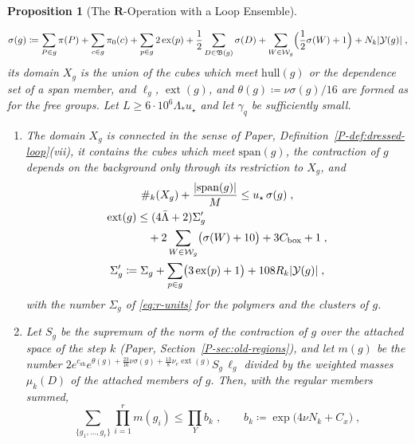 \documentclass[11pt]{preprint}
\DeclarePairedDelimiter{\abs}{\lvert}{\rvert}
\numberwithin{equation}{section}
\newtheorem{proposition}{Proposition}
\theoremstyle{definition}
\theoremstyle{remark}
\theoremstyle{plain}
\begin{document}
\begin{proposition}[The $\mathbf R$-Operation with a Loop Ensemble]
\begin{enumerate}[label=(\roman*)]
\begin{equation}\label{eq:r-bound-size}
    \sigma(g) \coloneqq \sum_{P \in g}\pi(P) + \sum_{c \in g}\pi_0(c) + \sum_{p \in g}2\operatorname{ex}(p) + \frac12\sum_{D \in \mathfrak B(g)}\sigma(D) + \sum_{W \in \mathcal W_g}\Bigl(\frac12\sigma(W) + 1\Bigr) + N_k\abs{\mathcal Y(g)}\;,
\end{equation}
its domain $X_g$ is the union of the cubes which meet $\mathrm{hull}(g)$ or the dependence set of a span member, and $\ell_g$, $\operatorname{ext}(g)$, and $\theta(g) \coloneqq \nu\sigma(g)/16$ are formed as for the free groups. Let $L \geq 6 \cdot 10^6\Lambda_*u_\star$ and let $\gamma_q$ be sufficiently small.
\begin{enumerate}[label=(\alph*)]
\item The domain $X_g$ is connected in the sense of Paper, Definition~\ref{P-def:dressed-loop}(vii), it contains the cubes which meet $\mathrm{span}(g)$, the contraction of $g$ depends on the background only through its restriction to $X_g$, and
\begin{equation}\label{eq:r-bound-units}
\begin{gathered}
    \#_k(X_g) + \frac{\abs{\mathrm{span}(g)}}{M} \leq u_\star\,\sigma(g)\;,\\
    \begin{aligned}
    \operatorname{ext}(g) &\leq (4\bar\Lambda + 2)\Sigma'_g\\
        &\quad + 2\sum_{W \in \mathcal W_g}\bigl(\sigma(W) + 10\bigr) + 3C_{\mathrm{box}} + 1\;,
    \end{aligned}\\
    \Sigma'_g \coloneqq \Sigma_g + \sum_{p \in g}\bigl(3\operatorname{ex}(p) + 1\bigr) + 108R_k\abs{\mathcal Y(g)}\;,
\end{gathered}
\end{equation}
with the number $\Sigma_g$ of \eqref{eq:r-units} for the polymers and the clusters of $g$.
\item Let $S_g$ be the supremum of the norm of the contraction of $g$ over the attached space of the step $k$ (Paper, Section~\ref{P-sec:old-regions}), and let $m(g)$ be the number $2e^{c_{\mathrm{sh}}}e^{\theta(g) + \frac{23}{16}\nu\sigma(g) + \frac{13}{8}\nu_e\operatorname{ext}(g)}S_g\,\ell_g$ divided by the weighted masses $\mu_k(D)$ of the attached members of $g$. Then, with the regular members summed,
\begin{equation}\label{eq:r-bound-product}
    \sum_{\{g_1, \dots, g_r\}}\prod_{i=1}^{r}m(g_i) \leq \prod_Yb_k\;,
    \qquad
    b_k \coloneqq \exp\bigl(4\nu N_k + C_x\bigr)\;,

\end{equation}
\end{enumerate}
\end{enumerate}
\end{proposition}
\end{document}
